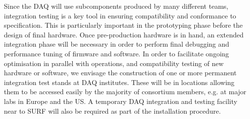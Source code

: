Since the DAQ will use subcomponents produced by many different teams, integration testing is a key tool in ensuring compatibility and conformance to specification. This is particularly important in the prototyping phase before the design of final hardware. Once pre-production hardware is in hand, an extended integration phase will be necessary in order to perform final debugging and performance tuning of firmware and software. In order to facilitate ongoing optimisation in parallel with operations, and compatibility testing of new hardware or software, we envisage the construction of one or more permanent integration test stands at DAQ institutes. These will be in locations allowing them to be accessed easily by the majority of consortium members, e.g. at major labs in Europe and the US. A temporary DAQ integration and testing facility near to SURF will also be required as part of the installation procedure.

